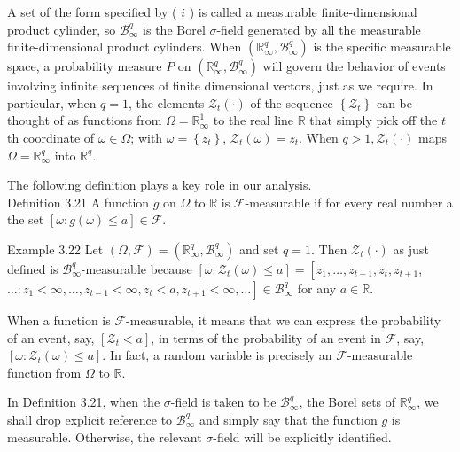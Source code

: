 \documentclass[10pt]{article}
\begin{document}
A set of the form specified by ( $i$ ) is called a measurable finite-dimensional product cylinder, so $\mathcal{B}_{\infty}^{q}$ is the Borel $\sigma$-field generated by all the measurable finite-dimensional product cylinders. When $\left(\mathbb{R}_{\infty}^{q}, \mathcal{B}_{\infty}^{q}\right)$ is the specific measurable space, a probability measure $P$ on $\left(\mathbb{R}_{\infty}^{q}, \mathcal{B}_{\infty}^{q}\right)$ will govern the behavior of events involving infinite sequences of finite dimensional vectors, just as we require. In particular, when $q=1$, the elements $\mathcal{Z}_{t}(\cdot)$ of the sequence $\left\{\mathcal{Z}_{t}\right\}$ can be thought of as functions from $\Omega=\mathbb{R}_{\infty}^{1}$ to the real line $\mathbb{R}$ that simply pick off the $t$ th coordinate of $\omega \in \Omega$; with $\omega=\left\{z_{t}\right\}$, $\mathcal{Z}_{t}(\omega)=z_{t}$. When $q>1, \mathcal{Z}_{t}(\cdot)$ maps $\Omega=\mathbb{R}_{\infty}^{q}$ into $\mathbb{R}^{q}$.

The following definition plays a key role in our analysis.\\
Definition 3.21 A function $g$ on $\Omega$ to $\mathbb{R}$ is $\mathcal{F}$-measurable if for every real number a the set $[\omega: g(\omega) \leq a] \in \mathcal{F}$.

Example 3.22 Let $(\Omega, \mathcal{F})=\left(\mathbb{R}_{\infty}^{q}, \mathcal{B}_{\infty}^{q}\right)$ and set $q=1$. Then $\mathcal{Z}_{t}(\cdot)$ as just defined is $\mathcal{B}_{\infty}^{q}$-measurable because $\left[\omega: \mathcal{Z}_{t}(\omega) \leq a\right]=\left[z_{1}, \ldots, z_{t-1}, z_{t}, z_{t+1}\right.$, $\left.\ldots: z_{1}<\infty, \ldots, z_{t-1}<\infty, z_{t}<a, z_{t+1}<\infty, \ldots\right] \in \mathcal{B}_{\infty}^{q}$ for any $a \in \mathbb{R}$.

When a function is $\mathcal{F}$-measurable, it means that we can express the probability of an event, say, $\left[\mathcal{Z}_{t}<a\right]$, in terms of the probability of an event in $\mathcal{F}$, say, $\left[\omega: \mathcal{Z}_{t}(\omega) \leq a\right]$. In fact, a random variable is precisely an $\mathcal{F}$-measurable function from $\Omega$ to $\mathbb{R}$.

In Definition 3.21, when the $\sigma$-field is taken to be $\mathcal{B}_{\infty}^{q}$, the Borel sets of $\mathbb{R}_{\infty}^{q}$, we shall drop explicit reference to $\mathcal{B}_{\infty}^{q}$ and simply say that the function $g$ is measurable. Otherwise, the relevant $\sigma$-field will be explicitly identified.
\end{document}
